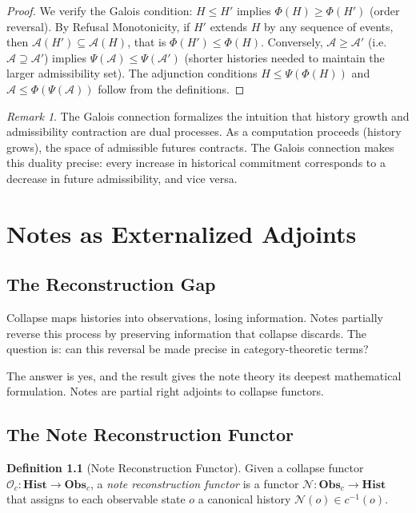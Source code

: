 \documentclass[12pt, a4paper, openany]{book}
\theoremstyle{plain}
\theoremstyle{definition}
\newtheorem{definition}[theorem]{Definition}
\theoremstyle{remark}
\newtheorem{remark}[theorem]{Remark}
\newcommand{\Hist}{\mathbf{Hist}}
\newcommand{\Obs}{\mathbf{Obs}}
\newcommand{\calA}{\mathcal{A}}
\begin{document}
\begin{proof}
We verify the Galois condition: $H \leq H'$ implies $\Phi(H) \geq \Phi(H')$
(order reversal). By Refusal Monotonicity, if $H'$ extends $H$ by any sequence
of events, then $\calA(H') \subseteq \calA(H)$, that is $\Phi(H') \leq \Phi(H)$.
Conversely, $\calA \geq \calA'$ (i.e.\ $\calA \supseteq \calA'$) implies
$\Psi(\calA) \leq \Psi(\calA')$ (shorter histories needed to maintain the larger
admissibility set). The adjunction conditions $H \leq \Psi(\Phi(H))$ and
$\calA \leq \Phi(\Psi(\calA))$ follow from the definitions.
\end{proof}

\begin{remark}
The Galois connection formalizes the intuition that history growth and admissibility
contraction are dual processes. As a computation proceeds (history grows), the
space of admissible futures contracts. The Galois connection makes this duality
precise: every increase in historical commitment corresponds to a decrease in
future admissibility, and vice versa.
\end{remark}

\chapter{Notes as Externalized Adjoints}

\section{The Reconstruction Gap}

Collapse maps histories into observations, losing information. Notes partially
reverse this process by preserving information that collapse discards. The
question is: can this reversal be made precise in category-theoretic terms?

The answer is yes, and the result gives the note theory its deepest mathematical
formulation. Notes are partial right adjoints to collapse functors.

\section{The Note Reconstruction Functor}

\begin{definition}[Note Reconstruction Functor]
Given a collapse functor $\mathcal{O}_c : \Hist \to \Obs_c$, a
\emph{note reconstruction functor} is a functor
$\mathcal{N} : \Obs_c \to \Hist$
that assigns to each observable state $o$ a canonical history
$\mathcal{N}(o) \in c^{-1}(o)$.
\end{definition}
\end{document}
